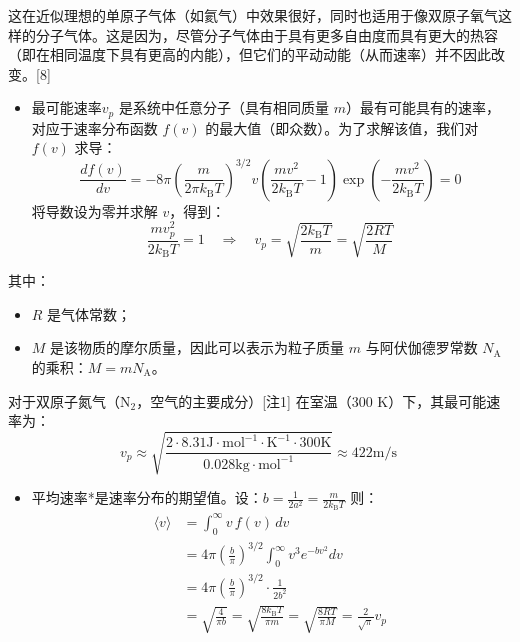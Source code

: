 这在近似理想的单原子气体（如氦气）中效果很好，同时也适用于像双原子氧气这样的分子气体。这是因为，尽管分子气体由于具有更多自由度而具有更大的热容（即在相同温度下具有更高的内能），但它们的平动动能（从而速率）并不因此改变。[8]
\begin{itemize}
\item 最可能速率$v_p$ 是系统中任意分子（具有相同质量 $m$）最有可能具有的速率，对应于速率分布函数 $f(v)$ 的最大值（即众数）。为了求解该值，我们对 $f(v)$ 求导：
$$
\frac{df(v)}{dv} = -8\pi \left( \frac{m}{2\pi k_{\text{B}}T} \right)^{3/2} v \left( \frac{mv^2}{2k_{\text{B}}T} - 1 \right) \exp\left( -\frac{mv^2}{2k_{\text{B}}T} \right) = 0~
$$
将导数设为零并求解 $v$，得到：
$$
\frac{m v_p^2}{2k_{\text{B}} T} = 1 \quad \Rightarrow \quad v_p = \sqrt{\frac{2k_{\text{B}} T}{m}} = \sqrt{\frac{2RT}{M}}~
$$
\end{itemize}
其中：
\begin{itemize}
\item $R$ 是气体常数；
\item $M$ 是该物质的摩尔质量，因此可以表示为粒子质量 $m$ 与阿伏伽德罗常数 $N_{\mathrm{A}}$ 的乘积：$M = m N_{\mathrm{A}}$。
\end{itemize}
对于双原子氮气（$\mathrm{N}_2$，空气的主要成分）[注1] 在室温（300 K）下，其最可能速率为：
$$
v_p \approx \sqrt{ \frac{2 \cdot 8.31 \mathrm{J \cdot mol^{-1} \cdot K^{-1}} \cdot 300 \mathrm{K}}{0.028 \mathrm{kg \cdot mol^{-1}}} } \approx 422 \mathrm{m/s}~
$$
\begin{itemize}
\item 平均速率*是速率分布的期望值。设：$b = \frac{1}{2a^2} = \frac{m}{2k_{\text{B}} T}$
则：
$$
\begin{aligned}
\langle v \rangle &= \int_0^\infty v\, f(v)\, dv \\
&= 4\pi \left( \frac{b}{\pi} \right)^{3/2} \int_0^\infty v^3 e^{-b v^2} dv \\
&= 4\pi \left( \frac{b}{\pi} \right)^{3/2} \cdot \frac{1}{2b^2} \\
&= \sqrt{ \frac{4}{\pi b} } = \sqrt{ \frac{8k_{\text{B}} T}{\pi m} } = \sqrt{ \frac{8RT}{\pi M} } = \frac{2}{\sqrt{\pi}} v_p
\end{aligned}~
$$
\end{itemize}
